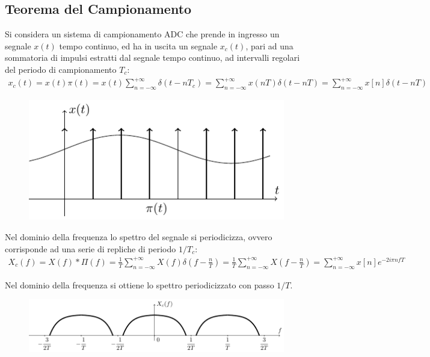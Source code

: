 \documentclass{article}
\numberwithin{equation}{subsection}
\begin{document}
\subsection{Teorema del Campionamento}

Si considera un sistema di campionamento ADC che prende in ingresso un segnale $x(t)$ tempo continuo, ed ha in uscita un segnale $x_c(t)$, pari ad una 
sommatoria di impulsi estratti dal segnale tempo continuo, ad intervalli regolari del periodo di campionamento $T_c$:
\begin{gather*}
    x_c(t)=x(t)\pi(t)=x(t)\displaystyle\sum_{n=-\infty}^{+\infty}\delta(t-nT_c)=\sum_{n=-\infty}^{+\infty}x(nT)\delta(t-nT)=\sum_{n=-\infty}^{+\infty}x[n]\delta(t-nT)
\end{gather*}
\begin{figure}[H]%
    \centering
    \includegraphics{segnale-campionato.pdf}%
\end{figure}
Nel dominio della frequenza lo spettro del segnale si periodicizza, ovvero corrisponde ad una serie di repliche di periodo $1/T_c$:
\begin{gather*}
    X_c(f)=X(f)*\Pi(f)=\displaystyle\frac{1}{T}\sum_{n=-\infty}^{+\infty}X(f)\delta\left(f-\frac{n}{T}\right)=\frac{1}{T}\sum_{n=-\infty}^{+\infty}X\left(f-\frac{n}{T}\right)=\sum_{n=-\infty}^{+\infty}x[n]e^{-2i\pi nfT}
\end{gather*}

Nel dominio della frequenza si ottiene lo spettro periodicizzato con passo $1/T$. 
\begin{figure}[H]%
    \centering
    \includegraphics{segnale-campionato-frequenza.pdf}%
\end{figure}
\end{document}

